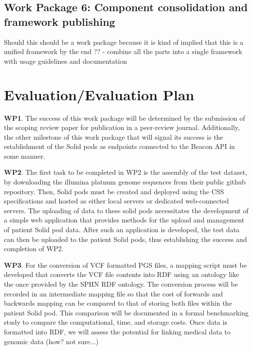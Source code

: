 \documentclass[runningheads]{llncs}
\begin{document}
\subsection{Work Package 6: Component consolidation and framework publishing}

Should this should be a work package because it is kind of implied that this is a unified framework by the end ??
- combine all the parts into a single framework with usage guidelines and documentation


\section{Evaluation/Evaluation Plan}

\textbf{WP1}. 
The success of this work package will be determined by the submission of the scoping review paper for publication in a peer-review journal. 
Additionally, the other milestone of this work package that will signal its success is the establishment of the Solid pods as endpoints connected to the Beacon API in some manner. 

\textbf{WP2}.
The first task to be completed in WP2 is the assembly of the test dataset, by downloading the illumina platnum genome sequences from their public github repository.
Then, Solid pods must be created and deployed using the CSS specifications and hosted as either local servers or dedicated web-connected servers.
The uploading of data to these solid pods necessitates the development of a simple web application that provides methods for the upload and management of patient Solid pod data. 
After such an application is developed, the test data can then be uploaded to the patient Solid pods, thus establishing the success and completion of WP2.

\textbf{WP3}.
For the conversion of VCF formatted PGS files, a mapping script must be developed that converts the VCF file contents into RDF using an ontology like the once provided by the SPHN RDF ontology. 
The conversion process will be recorded in an intermediate mapping file so that the cost of forwards and backwards mapping can be compared to that of storing both files within the patient Solid pod. 
This comparison will be documented in a formal benchmarking study to compare the computational, time, and storage costs.
Once data is formatted into RDF, we will assess the potential for linking medical data to genomic data (how? not sure...)
\end{document}
